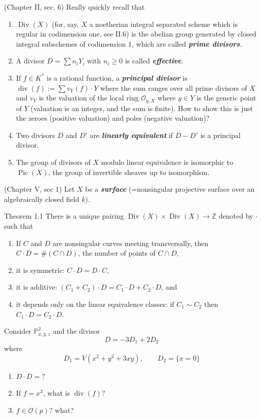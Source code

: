 (Chapter II, sec. 6) Really quickly recall that 
\begin{enumerate}
\item $\operatorname{Div}(X)$ (for, say, $X$ a noetherian integral separated scheme which is regular in codimension one, see II.6) is the abelian group generated by closed integral subschemes of codimension 1, which are called \textit{\textbf{prime divisors}}.
\item  A divisor $D=\sum n_i Y_i$ with $n_i\geq 0$ is called \textit{\textbf{effective}}.
\item  If $f \in K^*$ is a rational function, a \textit{\textbf{principal divisor}} is $\operatorname{div}(f):=\sum v_Y(f)\cdot Y$ where the sum ranges over all prime divisors of $X$ and $v_Y$ is the valuation of the local ring $\mathcal{O}_{y,X}$ where $y\in Y$ is the generic point of $Y$ (valuation is an integer, and the sum is finite). {\color{2}How to show this is just the zeroes (positive valuation) and poles (negative valuation)?}
\item  Two divisors $D$ and  $D'$ are \textit{\textbf{linearly equivalent}} if $D-D'$ is a principal divisor.
\item The group of divisors of $X$ modulo linear equivalence is isomorphic to $\operatorname{Pic}(X)$, the group of invertible sheaves up to isomorphism. 
\end{enumerate}

(Chapter V, sec 1) Let $X$ be a \textit{\textbf{surface}} (=nonsingular projective surface over an algebraically closed field  $k$).

\begin{thing4}{Theorem 1.1}\leavevmode
	There is a unique pairing $\operatorname{Div}(X)\times \operatorname{Div}(X)\to\mathbb{Z}$ denoted by $\cdot$ such that
	\begin{enumerate}
	\item If $C$ and $D$ are nonsingular curves meeting transversally, then $C\cdot D=\#(C\cap D)$, the number of points of $C \cap D$,
\item it is symmetric: $C\cdot D=D\cdot C$,
\item it is additive: $(C_1+C_2)\cdot D=C_1\cdot D+C_2\cdot D$, and 
\item it depends only on the linear equivalence classes: if $C_1\sim C_2$ then $C_1\cdot D=C_2\cdot D$. 
\end{enumerate}
\end{thing4}

\begin{exercise}\leavevmode
Consider $\mathbb{P}^2_{x,y,z}$ and the divisor \[D=-3D_1+2D_2\]
where
\[D_1=V(x^2+y^2+3xy),\qquad D_2=\{x=0\}\]
\begin{enumerate}[label=\alph*.]
\item $D\cdot D=?$ 
\item If $f=x^3$, what is $\operatorname{div}(f)$?
\item $f\in\mathcal{O}(p)$? what? 
\end{enumerate}
\end{exercise}

